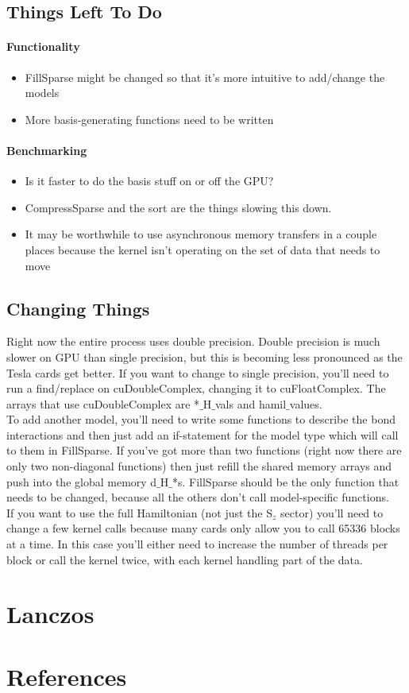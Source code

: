 \documentclass{article}
\begin{document}
\subsection{Things Left To Do}
\paragraph{Functionality}
\begin{itemize}
\item{FillSparse might be changed so that it's more intuitive to add/change the models}
\item{More basis-generating functions need to be written}
\end{itemize}
\paragraph{Benchmarking}
\begin{itemize}
\item{Is it faster to do the basis stuff on or off the GPU?}
\item{CompressSparse and the sort are the things slowing this down.}
\item{It may be worthwhile to use asynchronous memory transfers in a couple places because the kernel isn't operating on the set of data that needs to move}
\end{itemize}

\subsection{Changing Things}
Right now the entire process uses double precision. Double precision is much slower on GPU than single precision, but this is becoming less pronounced as the Tesla cards get better. If you want to change to single precision, you'll need to run a find/replace on cuDoubleComplex, changing it to cuFloatComplex. The arrays that use cuDoubleComplex are *$\_$H$\_$vals and hamil$\_$values.\\ 
To add another model, you'll need to write some functions to describe the bond interactions and then just add an if-statement for the model type which will call to them in FillSparse. If you've got more than two functions (right now there are only two non-diagonal functions) then just refill the shared memory arrays and push into the global memory d$\_$H$\_$*s. FillSparse should be the only function that needs to be changed, because all the others don't call model-specific functions.\\
If you want to use the full Hamiltonian (not just the S$_z$ sector) you'll need to change a few kernel calls because many cards only allow you to call 65336 blocks at a time. In this case you'll either need to increase the number of threads per block or call the kernel twice, with each kernel handling part of the data. 
 

\section{Lanczos}

\section{References}
\end{document}
